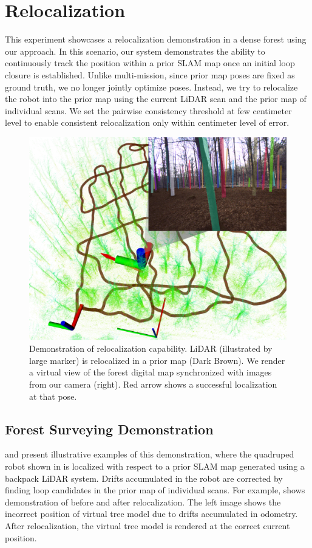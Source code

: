 \section{Relocalization} 
\label{sec:exp_relocalization}
This experiment showcases a relocalization demonstration in a dense forest using our approach. In this scenario, our system demonstrates the ability to continuously track the position within a prior SLAM map once an initial loop closure is established. Unlike multi-mission, since prior map poses are fixed as ground truth,  we no longer jointly optimize poses.
Instead, we try to relocalize the robot into the prior map using the current LiDAR scan and the prior map of individual scans. We set the pairwise consistency threshold at few centimeter level to enable consistent relocalization only within centimeter level of error. 
\begin{figure}[htbp]
  \centering
  \includegraphics[width=0.80\linewidth]{pics/exp_4_relocalization_demo.png}
  \caption{Demonstration of relocalization capability. LiDAR (illustrated by large marker) is relocalized in a prior map (Dark Brown). We render a virtual view of the forest digital map synchronized with images from our camera (right). Red arrow shows a successful localization at that pose.}
  \label{fig:relocalization_demo}
\end{figure}

\subsection*{Forest Surveying Demonstration}
 and  present illustrative examples of this demonstration, where the quadruped robot shown in  is localized with respect to a prior SLAM map generated using a backpack LiDAR system. Drifts accumulated in the robot are corrected by finding loop candidates in the prior map of individual scans. For example,   shows demonstration of before and after relocalization. The left image shows the incorrect position of virtual tree model due to drifts accumulated in odometry. After relocalization, the virtual tree model is rendered at the correct current position. 

